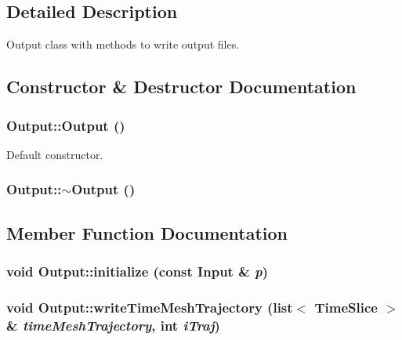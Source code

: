 \subsection{Detailed Description}
Output class with methods to write output files. 

\subsection{Constructor \& Destructor Documentation}
\subsubsection{\setlength{\rightskip}{0pt plus 5cm}Output::Output ()}\label{classOutput_428c663520336477a12f1a33504eb067}


Default constructor. 

\subsubsection{\setlength{\rightskip}{0pt plus 5cm}Output::$\sim$Output ()}\label{classOutput_61d0840daf98bea49e4dc471f235eeab}




\subsection{Member Function Documentation}
\subsubsection{\setlength{\rightskip}{0pt plus 5cm}void Output::initialize (const {\bf Input} \& {\em p})}\label{classOutput_656d3b4d04355381c544851ced239100}


\subsubsection{\setlength{\rightskip}{0pt plus 5cm}void Output::writeTimeMeshTrajectory (list$<$ {\bf TimeSlice} $>$ \& {\em timeMeshTrajectory}, \/  int {\em iTraj})}\label{classOutput_9ef20a9885c54757a4181fd007fcaa58}


